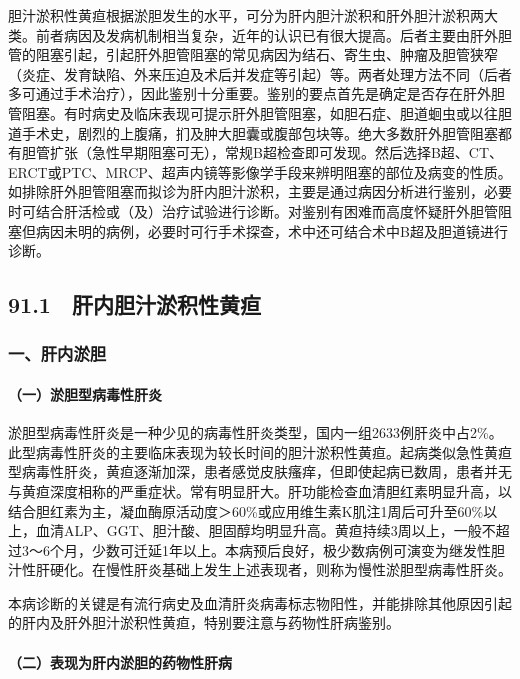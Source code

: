 胆汁淤积性黄疸根据淤胆发生的水平，可分为肝内胆汁淤积和肝外胆汁淤积两大类。前者病因及发病机制相当复杂，近年的认识已有很大提高。后者主要由肝外胆管的阻塞引起，引起肝外胆管阻塞的常见病因为结石、寄生虫、肿瘤及胆管狭窄（炎症、发育缺陷、外来压迫及术后并发症等引起）等。两者处理方法不同（后者多可通过手术治疗），因此鉴别十分重要。鉴别的要点首先是确定是否存在肝外胆管阻塞。有时病史及临床表现可提示肝外胆管阻塞，如胆石症、胆道蛔虫或以往胆道手术史，剧烈的上腹痛，扪及肿大胆囊或腹部包块等。绝大多数肝外胆管阻塞都有胆管扩张（急性早期阻塞可无），常规B超检查即可发现。然后选择B超、CT、ERCT或PTC、MRCP、超声内镜等影像学手段来辨明阻塞的部位及病变的性质。如排除肝外胆管阻塞而拟诊为肝内胆汁淤积，主要是通过病因分析进行鉴别，必要时可结合肝活检或（及）治疗试验进行诊断。对鉴别有困难而高度怀疑肝外胆管阻塞但病因未明的病例，必要时可行手术探查，术中还可结合术中B超及胆道镜进行诊断。

\subsection{91.1　肝内胆汁淤积性黄疸}

\subsubsection{一、肝内淤胆}

\paragraph{（一）淤胆型病毒性肝炎}

淤胆型病毒性肝炎是一种少见的病毒性肝炎类型，国内一组2633例肝炎中占2\%。此型病毒性肝炎的主要临床表现为较长时间的胆汁淤积性黄疸。起病类似急性黄疸型病毒性肝炎，黄疸逐渐加深，患者感觉皮肤瘙痒，但即使起病已数周，患者并无与黄疸深度相称的严重症状。常有明显肝大。肝功能检查血清胆红素明显升高，以结合胆红素为主，凝血酶原活动度＞60\%或应用维生素K肌注1周后可升至60\%以上，血清ALP、GGT、胆汁酸、胆固醇均明显升高。黄疸持续3周以上，一般不超过3～6个月，少数可迁延1年以上。本病预后良好，极少数病例可演变为继发性胆汁性肝硬化。在慢性肝炎基础上发生上述表现者，则称为慢性淤胆型病毒性肝炎。

本病诊断的关键是有流行病史及血清肝炎病毒标志物阳性，并能排除其他原因引起的肝内及肝外胆汁淤积性黄疸，特别要注意与药物性肝病鉴别。

\paragraph{（二）表现为肝内淤胆的药物性肝病}

